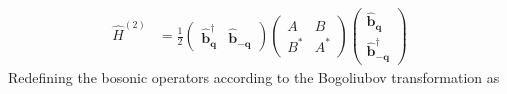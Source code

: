 \begin{align}
\hat{H}^{(2)}&= \frac{1}{2}
    \begin{pmatrix}
        \hat{\bm{b}}_{\mathbf q}^{\dagger} &
        \hat{\bm{b}}_{-\mathbf q}
    \end{pmatrix}
    \begin{pmatrix}
        A & B\\
        B^{*} & A^{*}
    \end{pmatrix}
    \begin{pmatrix}
        \hat{\bm{b}}_{\mathbf q}\\
        \hat{\bm{b}}_{-\mathbf q}^{\dagger}
    \end{pmatrix}
\end{align}
Redefining the bosonic operators according to the Bogoliubov transformation as

